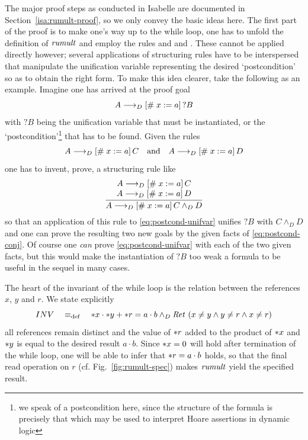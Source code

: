 The major proof steps as conducted in Isabelle are documented in
Section~\ref{isa:rumult-proof}, so we only convey the basic ideas here. The
first part of the proof is to make one's way up to the while loop, \IE one has
to unfold the definition of $\mathit{rumult}$ and employ the rules
 and  and . These
cannot be applied directly however; several applications of structuring rules
have to be interspersed that manipulate the unification variable representing
the desired `postcondition' so as to obtain the right form. To make this idea
clearer, take the following  as an example. Imagine one has arrived at the
proof goal
\begin{equation}\label{eq:postcond-unifvar}
  A \longrightarrow_D [\#\;x := a]\,{?B}
\end{equation}
with $?B$ being the unification variable that must be instantiated, or the
`postcondition'\footnote{we speak of a postcondition here, since the structure
  of the formula is precisely that which may be used to interpret Hoare
  assertions in dynamic logic} that has to be found. Given the rules
\begin{equation} \label{eq:postcond-conj}
  A \longrightarrow_D [\#\;x := a]\,{C} \quad\text{and}\quad A \longrightarrow_D [\#\;x := a]\,{D}
\end{equation}
one has to invent, \IE prove, a structuring rule like
\[
\frac{\displaystyle \begin{array}{cc}
        A \longrightarrow_D [\#\;x := a]\,{C}\\
        A \longrightarrow_D [\#\;x := a]\,{D}
      \end{array}}{\displaystyle A \longrightarrow_D [\#\;x := a]\,{C \land_D D}}
\]
so that an application of this rule to \eqref{eq:postcond-unifvar} unifies $?B$
with $C \land_D D$ and one can prove the resulting two new goals by the given facts
of \eqref{eq:postcond-conj}. Of course one \emph{can} prove
\eqref{eq:postcond-unifvar} with each of the two given facts, but this would 
make the instantiation of $?B$ too weak a formula to be useful in the sequel in
many cases.

The heart of the invariant of the while loop is the relation between the
references $x$, $y$ and $r$. We state explicitly
\[
  INV \quad\equiv_{\mathrm{def}}\quad {\ast x} \cdot {\ast y} + {\ast r} = a \cdot b \land_D \mathit{Ret}\ (x \neq y \land y\neq r \land
  x\neq r)
\]
\IE all references remain distinct and the value of ${\ast r}$ added to the
product of ${\ast x}$ and ${\ast y}$ is equal to the desired result $a \cdot b$. Since
${\ast x} = 0$ will hold after termination of the while loop, one will be able to
infer that ${\ast r} = a \cdot b$ holds, so that the final read operation on $r$ (cf.
Fig.~\ref{fig:rumult-spec}) makes $\mathit{rumult}$ yield the specified result.

